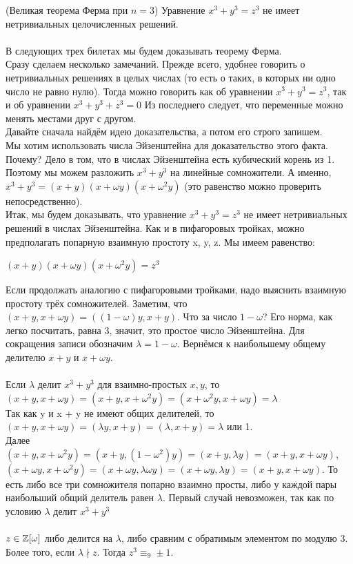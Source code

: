 \Th (Великая теорема Ферма при $n = 3$)
	Уравнение $x^3 + y^3 = z^3$ не имеет нетривиальных целочисленных решений.
\\
\\
В следующих трех билетах мы будем доказывать теорему Ферма. 
\\
Сразу сделаем несколько замечаний. Прежде всего, удобнее
говорить о нетривиальных решениях в целых числах (то есть о таких, в которых ни одно число не равно нулю). Тогда можно
говорить как об уравнении $x^3 + y^3 = z^3$, так и об уравнении $x^3 + y^3 + z^3 = 0$ Из последнего следует, что переменные можно менять местами друг с другом. \\
Давайте сначала найдём идею доказательства, а потом его строго запишем.
\\
Мы хотим использовать числа Эйзенштейна для доказательство этого факта. Почему? Дело в том, что в числах Эйзенштейна есть кубический корень из 1. Поэтому мы можем разложить $x^3 + y^3$ на линейные сомножители. А именно, $x^3 + y^3 = (x + y)(x + \omega y)(x + \omega^2y)$  (это равенство можно проверить непосредственно). \\
Итак, мы будем доказывать, что уравнение
$x^3 + y^3 = z^3$ не
имеет нетривиальных решений в числах Эйзенштейна. Как и в пифагоровых тройках, можно предполагать попарную взаимную
простоту x, y, z. Мы имеем равенство:
\begin{center}
    $(x + y)(x + \omega y)(x + \omega^2y) = z^3$
\end{center}
Если продолжать аналогию с пифагоровыми тройками, надо выяснить взаимную простоту трёх сомножителей. Заметим, что
$(x + y, x + \omega y) = ((1 - \omega)y, x + y)$.
Что за число $1 − \omega$? Его норма, как легко посчитать, равна 3,
значит, это простое число Эйзенштейна. Для сокращения записи обозначим
$\lambda = 1 - \omega$. Вернёмся к наибольшему общему делителю $x + y$ и $x + \omega y $.
\\
\\
\Lemma
 Если $\lambda$ делит $x^3 + y^3$ для взаимно-простых $x, y$, то $(x + y, x + \omega y) = (x + y, x + \omega^2 y) = (x + \omega^2y, x + \omega y) = \lambda$
 \\
 \Proof
Так как y и x + y не имеют общих делителей, то
$(x + y, x + \omega y) = (\lambda y, x + y) = (\lambda, x + y) = \lambda$ или 1.
\\
Далее $(x + y, x + \omega^2 y) = (x + y,(1 - \omega^2)y) = (x + y, \lambda y) = (x + y, x + \omega y)$,
\\
$(x + \omega y, x + \omega^2y) = (x + \omega y, \lambda \omega y) = (x + \omega y, \lambda y) = (x + y, x + \omega y)$.
То есть либо все три сомножителя попарно взаимно просты, либо у каждой пары наибольший общий делитель равен $\lambda$. Первый случай невозможен, так как по условию $\lambda$ делит $x^3 + y^3$
\EndProof
\\
\\
\Lemma
	$z \in \mathbb{Z}[\omega]$ либо делится на
    $\lambda$, либо сравним с обратимым элементом по модулю 3. Более того, если $\lambda \nmid z$. Тогда $z^3 \equiv_9 \pm 1$.

